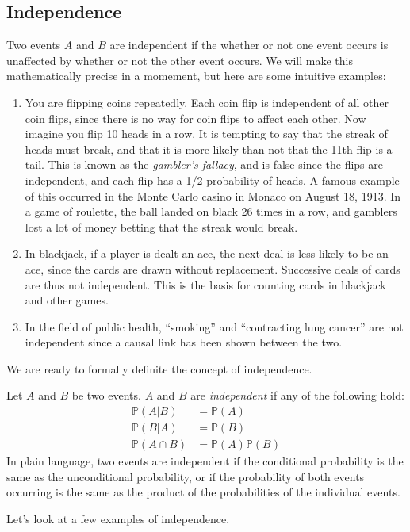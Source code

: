 \documentclass[12pt]{article}
\theoremstyle{definition}
\theoremstyle{remark}
\def\P{{\mathbb P}}
\begin{document}
\subsection{Independence}
Two events $A$ and $B$ are independent if the whether or not one event occurs is unaffected by whether or not the other event occurs. We will make this mathematically precise in a momement, but here are some intuitive examples:
\begin{enumerate}
\item You are flipping coins repeatedly. Each coin flip is independent of all other coin flips, since there is no way for coin flips to affect each other. Now imagine you flip 10 heads in a row. It is tempting to say that the streak of heads must break, and that it is more likely than not that the 11th flip is a tail. This is known as the \emph{gambler's fallacy}, and is false since the flips are independent, and each flip has a 1/2 probability of heads. A famous example of this occurred in the Monte Carlo casino in Monaco on August 18, 1913. In a game of roulette, the ball landed on black 26 times in a row, and gamblers lost a lot of money betting that the streak would break.
\item In blackjack, if a player is dealt an ace, the next deal is less likely to be an ace, since the cards are drawn without replacement. Successive deals of cards are thus not independent. This is the basis for counting cards in blackjack and other games.
\item In the field of public health, ``smoking'' and ``contracting lung cancer'' are not independent since a causal link has been shown between the two.
\end{enumerate}
We are ready to formally definite the concept of independence.

\begin{framed}
Let $A$ and $B$ be two events. $A$ and $B$ are \emph{independent} if any of the following hold:
\begin{align*}
\P(A|B) &= \P(A) \\
\P(B|A) &= \P(B) \\
\P(A \cap B) &= \P(A)\P(B)
\end{align*}
In plain language, two events are independent if the conditional probability is the same as the unconditional probability, or if the probability of both events occurring is the same as the product of the probabilities of the individual events.
\end{framed}

Let's look at a few examples of independence.
\end{document}

